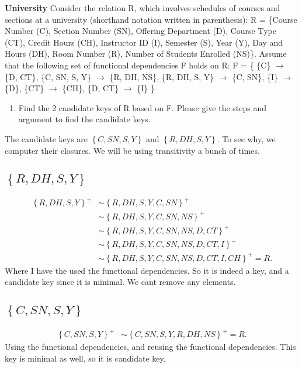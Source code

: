 \documentclass[working, oneside]{../../Preambles/tuftebook}
\begin{document}
\begin{exercise}[2]
 \textbf{University}
    Consider the relation R, which involves schedules of courses and sections at a university (shorthand notation written in parenthesis):
    R = \{Course Number (C), Section Number (SN), Offering Department (D), Course Type (CT), Credit Hours (CH), Instructor ID (I), Semester (S), Year (Y), Day and Hours (DH), Room Number (R), Number of Students Enrolled (NS)\}.
    Assume that the following set of functional dependencies F holds on R:
    F = \{ \{C\} $\rightarrow$ \{D, CT\}, \{C, SN, S, Y\} $\rightarrow$ \{R, DH, NS\}, \{R, DH, S, Y\} $\rightarrow$ \{C, SN\}, \{I\} $\rightarrow$ \{D\}, \{CT\} $\rightarrow$ \{CH\}, \{D, CT\} $\rightarrow$ \{I\} \}
    \begin{enumerate}
        \item Find the 2 candidate keys of R based on F. Please give the steps and argument to find the candidate keys.
\end{enumerate}
\end{exercise}
\begin{solution}
The candidate keys are $\left\{ C, SN, S, Y \right\} $ and $\left\{ R, DH, S, Y \right\} $. To see why, we computer their closures. We will be using transitivity a bunch of times.
\subsection*{$\left\{ R, DH, S, Y \right\}$} 
\begin{align*}
    \left\{ R, DH, S, Y \right\}^{+} &\sim \left\{ R, DH, S, Y, C, SN \right\}^{+} \\
                                     &\sim \left\{ R, DH, S, Y, C, SN, NS \right\}^{+} \\
                                     &\sim \left\{ R, DH, S, Y, C, SN, NS, D, CT \right\}^{+} \\
                                     &\sim \left\{ R, DH, S, Y, C, SN, NS, D, CT, I \right\}^{+} \\
                                     &\sim \left\{ R, DH, S, Y, C, SN, NS, D, CT, I, CH \right\}^{+} = R
.\end{align*}
Where I have the used the functional dependencies. So it is indeed a key, and a candidate key since it is minimal. We cant remove any elements.
\subsection*{$\left\{ C, SN, S, Y \right\}$} 
\begin{align*}
    \left\{ C, SN, S, Y \right\} ^{+} &\sim \left\{ C, SN, S, Y, R, DH, NS \right\} ^{+}= R
.\end{align*}
Using the functional dependencies, and reusing the functional dependencies. This key is minimal as well, so it is candidate key.
\end{solution}
\end{document}
